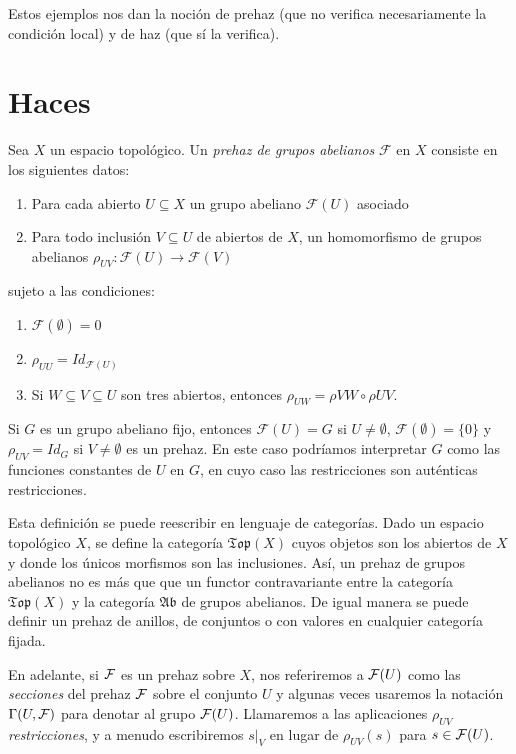 \documentclass[GA.tex]{subfiles}
\begin{document}
Estos ejemplos nos dan la noción de prehaz (que no verifica necesariamente la condición local) y de haz (que sí la verifica).

\section{Haces}

\begin{defi}
Sea $X$ un espacio topológico. Un \emph{prehaz de grupos abelianos} $\mathcal{F}$ en $X$ consiste en los siguientes datos:
\begin{enumerate}
\item Para cada abierto $U\subseteq X$ un grupo abeliano $\mathcal{F}(U)$ asociado
\item Para todo inclusión $V\subseteq U$ de abiertos de $X$, un homomorfismo de grupos abelianos $\rho_{UV}:\mathcal{F}(U)\to\mathcal{F}(V)$
\end{enumerate}
sujeto a las condiciones:
\begin{enumerate}
\item $\mathcal{F}(\emptyset)=0$
\item $\rho_{UU}=Id_{\mathcal{F}(U)}$
\item Si $W\subseteq V\subseteq U$ son tres abiertos, entonces $\rho_{UW}=\rho{VW}\circ \rho{UV}$.
\end{enumerate}

\end{defi}

\begin{ej}
Si $G$  es un grupo abeliano fijo, entonces $\mathcal{F}(U)=G$ si $U\neq\emptyset$, $\mathcal{F}(\emptyset)=\{0\}$ y $\rho_{UV}=Id_G$ si $V\neq \emptyset$ es un prehaz. En este caso podríamos interpretar $G$ como las funciones constantes de $U$ en $G$, en cuyo caso las restricciones son auténticas restricciones.
\end{ej}

Esta definición se puede reescribir en lenguaje de categorías. Dado un espacio topológico $X$, se define la categoría $\mathfrak{Top}(X)$ cuyos objetos son los abiertos de $X$ y donde los únicos morfismos son las inclusiones. Así, un prehaz de grupos abelianos no es más que que un functor contravariante entre la categoría $\mathfrak{Top}(X)$ y la categoría $\mathfrak{Ab}$ de grupos abelianos. De igual manera se puede definir un prehaz de anillos, de conjuntos o con valores en cualquier categoría fijada.

En adelante, si $\mathcal{F}$ es un prehaz sobre $X$, nos referiremos a $\mathcal{F}(U)$ como las \emph{secciones} del prehaz $\mathcal{F}$ sobre el conjunto $U$ y algunas veces usaremos la notación $\Gamma(U,\mathcal{F})$ para denotar al grupo $\mathcal{F}(U)$. Llamaremos a las aplicaciones $\rho_{UV}$ \emph{restricciones}, y a menudo escribiremos $s|_V$ en lugar de $\rho_{UV}(s)$ para $s\in\mathcal{F}(U)$. 
\end{document}
